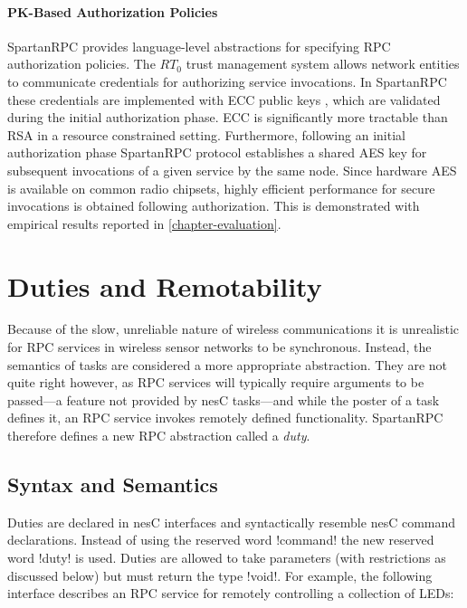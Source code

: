 \paragraph{PK-Based Authorization Policies} SpartanRPC provides language-level abstractions for
specifying RPC authorization policies. The $RT_0$ trust management system allows network
entities to communicate credentials for authorizing service invocations. In SpartanRPC these
credentials are implemented with ECC public keys \cite{bertoni-2006}, which are validated during
the initial authorization phase. ECC is significantly more tractable than RSA in a resource
constrained setting. Furthermore, following an initial authorization phase SpartanRPC protocol
establishes a shared AES key for subsequent invocations of a given service by the same node.
Since hardware AES is available on common radio chipsets, highly efficient performance
for secure invocations is obtained following authorization. This is demonstrated with empirical results
reported in \autoref{chapter-evaluation}.

\section{Duties and Remotability}
\label{section-duties}

Because of the slow, unreliable nature of wireless communications it is unrealistic for RPC
services in wireless sensor networks to be synchronous. Instead, the semantics of tasks are
considered a more appropriate abstraction. They are not quite right however, as RPC services
will typically require arguments to be passed---a feature not provided by nesC tasks---and while
the poster of a task defines it, an RPC service invokes remotely defined functionality.
SpartanRPC therefore defines a new RPC abstraction called a \emph{duty}.

\subsection{Syntax and Semantics}
\label{section-duties-syntax}

Duties are declared in nesC interfaces and syntactically resemble nesC command declarations.
Instead of using the reserved word !command! the new reserved word !duty! is used. Duties are
allowed to take parameters (with restrictions as discussed below) but must return the type
!void!. For example, the following interface describes an RPC service for remotely controlling a
collection of LEDs:

